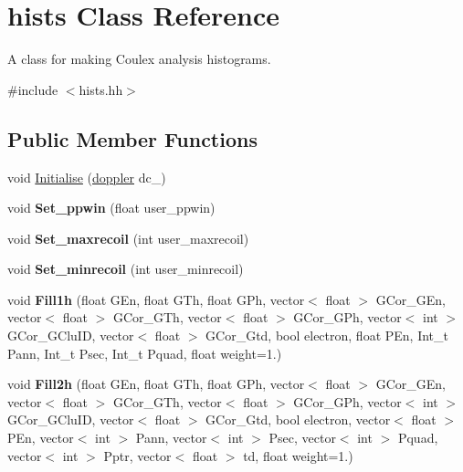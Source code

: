 \hypertarget{classhists}{\section{hists Class Reference}
\label{classhists}
}


A class for making Coulex analysis histograms.  




{\ttfamily \#include $<$hists.\-hh$>$}

\subsection*{Public Member Functions}
\begin{DoxyCompactItemize}
\item 
void \hyperlink{classhists_affb3dcaefba3b63d20bbe438030e2f81}{Initialise} (\hyperlink{classdoppler}{doppler} dc\-\_\-)
\item 
\hypertarget{classhists_a98cf7d91940c6d77105d07b0783399ee}{void {\bfseries Set\-\_\-ppwin} (float user\-\_\-ppwin)}\label{classhists_a98cf7d91940c6d77105d07b0783399ee}

\item 
\hypertarget{classhists_ae986e831e139c9e7e5a4e327e864484d}{void {\bfseries Set\-\_\-maxrecoil} (int user\-\_\-maxrecoil)}\label{classhists_ae986e831e139c9e7e5a4e327e864484d}

\item 
\hypertarget{classhists_acfb845682216224712565e7b8a1c3ce2}{void {\bfseries Set\-\_\-minrecoil} (int user\-\_\-minrecoil)}\label{classhists_acfb845682216224712565e7b8a1c3ce2}

\item 
\hypertarget{classhists_a4cc3927b58899125a7691a50101fb902}{void {\bfseries Fill1h} (float G\-En, float G\-Th, float G\-Ph, vector$<$ float $>$ G\-Cor\-\_\-\-G\-En, vector$<$ float $>$ G\-Cor\-\_\-\-G\-Th, vector$<$ float $>$ G\-Cor\-\_\-\-G\-Ph, vector$<$ int $>$ G\-Cor\-\_\-\-G\-Clu\-I\-D, vector$<$ float $>$ G\-Cor\-\_\-\-Gtd, bool electron, float P\-En, Int\-\_\-t Pann, Int\-\_\-t Psec, Int\-\_\-t Pquad, float weight=1.)}\label{classhists_a4cc3927b58899125a7691a50101fb902}

\item 
\hypertarget{classhists_a84e3dd3dc98652844bbfea63652eb280}{void {\bfseries Fill2h} (float G\-En, float G\-Th, float G\-Ph, vector$<$ float $>$ G\-Cor\-\_\-\-G\-En, vector$<$ float $>$ G\-Cor\-\_\-\-G\-Th, vector$<$ float $>$ G\-Cor\-\_\-\-G\-Ph, vector$<$ int $>$ G\-Cor\-\_\-\-G\-Clu\-I\-D, vector$<$ float $>$ G\-Cor\-\_\-\-Gtd, bool electron, vector$<$ float $>$ P\-En, vector$<$ int $>$ Pann, vector$<$ int $>$ Psec, vector$<$ int $>$ Pquad, vector$<$ int $>$ Pptr, vector$<$ float $>$ td, float weight=1.)}\label{classhists_a84e3dd3dc98652844bbfea63652eb280}


\end{DoxyCompactItemize}
